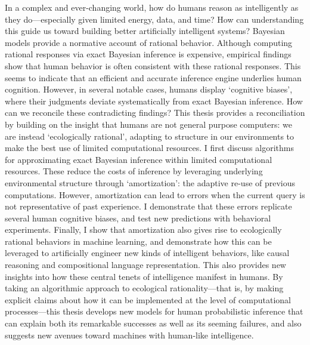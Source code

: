 

In a complex and ever-changing world, how do humans reason as intelligently as they do---especially given limited energy, data, and time?
How can understanding this guide us toward building better artificially intelligent systems?
Bayesian models provide a normative account of rational behavior. Although computing rational responses via exact Bayesian inference is expensive, empirical findings show that human behavior is often consistent with these rational responses. 
This seems to indicate that an efficient and accurate inference engine underlies human cognition. 
However, in several notable cases, humans display `cognitive biases', where their judgments deviate systematically from exact Bayesian inference. 
How can we reconcile these contradicting findings? 
This thesis provides a reconciliation by building on the insight that humans are not general purpose computers: we are instead `ecologically rational', adapting to structure in our environments to make the best use of limited computational resources. 
I first discuss %
algorithms for approximating exact Bayesian inference within limited computational resources. 
These reduce the costs of inference by leveraging underlying environmental structure through `amortization': the adaptive re-use of previous computations. 
However, amortization can lead to errors when the current query is not representative of past experience. 
I demonstrate that these errors replicate several human cognitive biases, and test new predictions with behavioral experiments. 
Finally, I show that amortization also gives rise to ecologically rational behaviors in machine learning, and demonstrate how this can be leveraged to artificially engineer new kinds of intelligent behaviors, like causal reasoning and compositional language representation. 
This also provides new insights into how these central tenets of intelligence manifest in humans. 
By taking an algorithmic approach to ecological rationality---that is, by making explicit claims about how it can be implemented at the level of computational processes---this thesis develops new models for human probabilistic inference that can explain both its remarkable successes as well as its seeming failures, and also suggests new avenues toward machines with human-like intelligence.